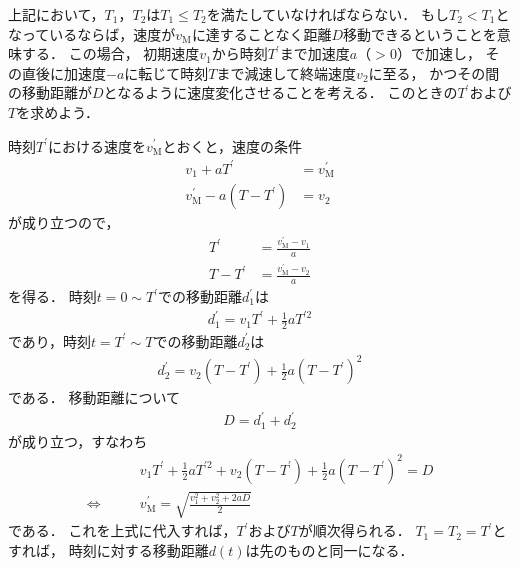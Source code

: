 ﻿\documentclass[a4paper]{jsarticle}
\begin{document}
\begin{figure}[h]
\begin{center}

\end{center}
\end{figure}

上記において，$T_{1}$，$T_{2}$は$T_{1}\leq T_{2}$を満たしていなければならない．
もし$T_{2}<T_{1}$となっているならば，速度が$v_{\mathrm{M}}$に達することなく距離$D$移動できるということを意味する．
この場合，
初期速度$v_{1}$から時刻$T^{\prime}$まで加速度$a$（$>0$）で加速し，
その直後に加速度$-a$に転じて時刻$T$まで減速して終端速度$v_{2}$に至る，
かつその間の移動距離が$D$となるように速度変化させることを考える．
このときの$T^{\prime}$および$T$を求めよう．

時刻$T^{\prime}$における速度を$v_{\mathrm{M}}^{\prime}$とおくと，速度の条件
\begin{align}
v_{1}+aT^{\prime}&=v_{\mathrm{M}}^{\prime} \\
v_{\mathrm{M}}^{\prime}-a(T-T^{\prime})&=v_{2}
\end{align}
が成り立つので，
\begin{align}
T^{\prime}&=\frac{v_{\mathrm{M}}^{\prime}-v_{1}}{a} \\
T-T^{\prime}&=\frac{v_{\mathrm{M}}^{\prime}-v_{2}}{a}
\end{align}
を得る．
時刻$t=0\sim T^{\prime}$での移動距離$d_{1}^{\prime}$は
\begin{align}
d_{1}^{\prime}=v_{1}T^{\prime}+\frac{1}{2}aT^{\prime 2}
\end{align}
であり，時刻$t=T^{\prime}\sim T$での移動距離$d_{2}^{\prime}$は
\begin{align}
d_{2}^{\prime}=v_{2}(T-T^{\prime})+\frac{1}{2}a(T-T^{\prime})^{2}
\end{align}
である．
移動距離について
\begin{align}
D=d_{1}^{\prime}+d_{2}^{\prime}
\end{align}
が成り立つ，すなわち
\begin{align}
&v_{1}T^{\prime}+\frac{1}{2}aT^{\prime 2}
+v_{2}(T-T^{\prime})+\frac{1}{2}a(T-T^{\prime})^{2}
=D
\nonumber \\
\Leftrightarrow\qquad&
v_{\mathrm{M}}^{\prime}=\sqrt{\frac{v_{1}^{2}+v_{2}^{2}+2aD}{2}}
\end{align}
である．
これを上式に代入すれば，$T^{\prime}$および$T$が順次得られる．
$T_{1}=T_{2}=T^{\prime}$とすれば，
時刻に対する移動距離$d(t)$は先のものと同一になる．
\end{document}
